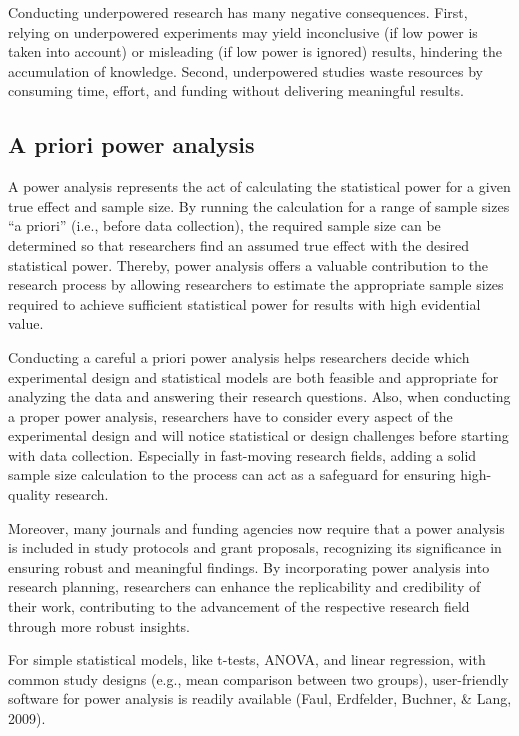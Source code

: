 \documentclass[
  man,floatsintext]{apa6}
\begin{document}
Conducting underpowered research has many negative consequences. First, relying on underpowered experiments may yield inconclusive (if low power is taken into account) or misleading (if low power is ignored) results, hindering the accumulation of knowledge. Second, underpowered studies waste resources by consuming time, effort, and funding without delivering meaningful results.

\hypertarget{a-priori-power-analysis}{%
\subsection{A priori power analysis}\label{a-priori-power-analysis}}

A power analysis represents the act of calculating the statistical power for a given true effect and sample size.
By running the calculation for a range of sample sizes ``a priori'' (i.e., before data collection), the required sample size can be determined so that researchers find an assumed true effect with the desired statistical power.
Thereby, power analysis offers a valuable contribution to the research process by allowing researchers to estimate the appropriate sample sizes required to achieve sufficient statistical power for results with high evidential value.

Conducting a careful a priori power analysis helps researchers decide which experimental design and statistical models are both feasible and appropriate for analyzing the data and answering their research questions.
Also, when conducting a proper power analysis, researchers have to consider every aspect of the experimental design and will notice statistical or design challenges before starting with data collection.
Especially in fast-moving research fields, adding a solid sample size calculation to the process can act as a safeguard for ensuring high-quality research.

Moreover, many journals and funding agencies now require that a power analysis is included in study protocols and grant proposals, recognizing its significance in ensuring robust and meaningful findings. By incorporating power analysis into research planning, researchers can enhance the replicability and credibility of their work, contributing to the advancement of the respective research field through more robust insights.

For simple statistical models, like t-tests, ANOVA, and linear regression, with common study designs (e.g., mean comparison between two groups), user-friendly software for power analysis is readily available (Faul, Erdfelder, Buchner, \& Lang, 2009).
\end{document}
